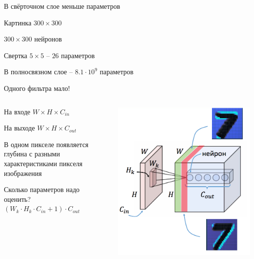 \documentclass[notes,12pt, aspectratio=169]{beamer}
\newenvironment{wideitemize}{\itemize\addtolength{\itemsep}{10pt}}{\enditemize}
\begin{document}
\begin{frame}{В свёрточном слое меньше параметров}
\begin{wideitemize}
	\item  Картинка $300 \times 300$
	\item  $300 \times 300$  нейронов
	\item  Свертка $5 \times 5$ – $26$ параметров
	\item В полносвязном слое – $8.1 \cdot 10^9$ параметров
\end{wideitemize}
\end{frame}


\begin{frame}{Одного фильтра мало!}
\begin{columns}
	\begin{column}{.49\textwidth}
		\begin{wideitemize} 
			\item На входе $W \times H \times C_{in}$
			\item На выходе $W \times H \times C_{out}$
			\item В одном пикселе появляется глубина с разными характеристиками пикселя изображения
			\item {} {\alert{Сколько параметров надо оценить?}}  \only<2> {$(W_k \cdot H_k \cdot C_{in} + 1) \cdot C_{out}$}
		\end{wideitemize}
	\end{column}
	\begin{column}{.49\textwidth}
		\begin{center}
			\includegraphics[width=.9\linewidth]{convolution3.png}
		\end{center}
	\end{column}
\end{columns}
\end{frame}
\end{document}

